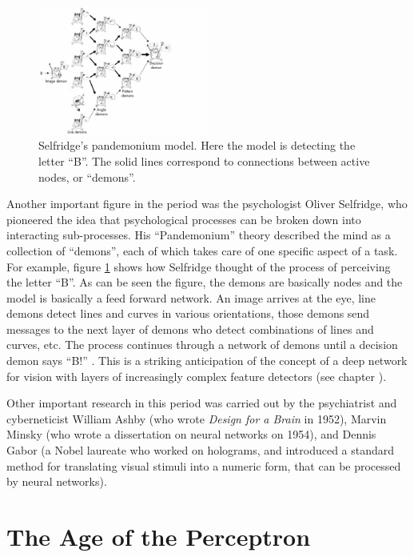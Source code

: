 \begin{figure}[h]
\centering
\includegraphics[width=0.5\textwidth]{./images/Selfridge.png}
\caption[From Groome, 2013 \cite{groome2013introduction}]{Selfridge's pandemonium model. Here the model is detecting the letter ``B''. The solid lines correspond to connections between active nodes, or ``demons''.}
\label{selfridge}
\end{figure}

Another important figure in the period was the psychologist Oliver Selfridge, who pioneered the idea that psychological processes can be broken down into interacting sub-processes. His ``Pandemonium'' theory described the mind as a collection of ``demons'', each of which takes care of one specific aspect of a task. For example, figure \ref{selfridge} shows how Selfridge thought of the process of perceiving the letter ``B''. As can be seen the figure, the demons are basically nodes and the model is basically a feed forward network. An image arrives at the eye, line demons detect lines and curves in various orientations, those demons send messages to the next layer of demons who detect combinations of lines and curves, etc. The process continues through a network of demons until a decision demon says ``B!'' \cite{selfridge1958pandemonium}.  This is a striking anticipation of the concept of a deep network for vision with layers of increasingly complex feature detectors (see chapter ).

Other important research in this period was carried out by the psychiatrist and cyberneticist William Ashby (who wrote \emph{Design for a Brain} in 1952), Marvin Minsky (who wrote a dissertation on neural networks on 1954), and Dennis Gabor (a Nobel laureate who worked on holograms, and introduced a standard method for translating visual stimuli into a numeric form, that can be processed by neural networks).

\section{The Age of the Perceptron}

